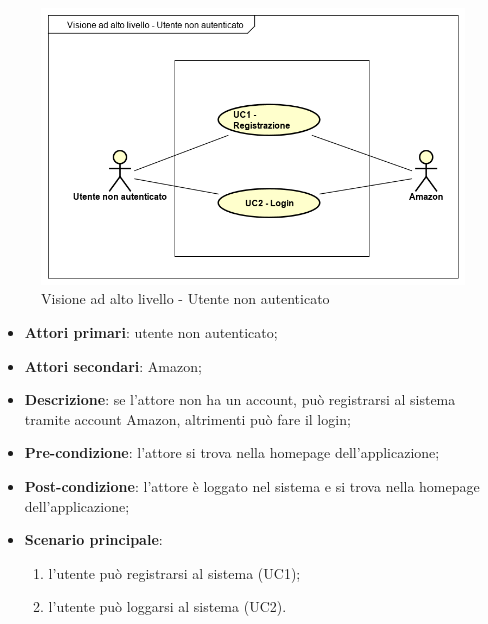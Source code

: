 \begin{figure}[H]
\centering
\includegraphics[scale=0.7]{immagini/UC0-1.png}
\caption{Visione ad alto livello - Utente non autenticato \label{fig:uc0-1}}
\end{figure}
\begin{itemize}
\item \textbf{Attori primari}: utente non autenticato;

\item \textbf{Attori secondari}: Amazon;

\item \textbf{Descrizione}: se l'attore non ha un account, può registrarsi al sistema tramite account Amazon, altrimenti può fare il login;

\item \textbf{Pre-condizione}: l'attore si trova nella homepage dell'applicazione;

\item \textbf{Post-condizione}: l'attore è loggato nel sistema e si trova nella homepage dell'applicazione;

\item \textbf{Scenario principale}:
\begin{enumerate}
\item l'utente può registrarsi al sistema (UC1);
\item l'utente può loggarsi al sistema (UC2).
\end{enumerate}

\end{itemize}
\pagebreak
